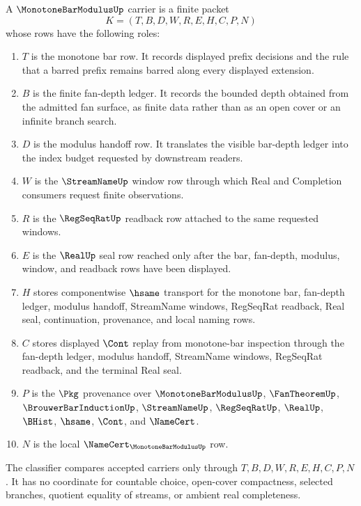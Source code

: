 \begin{definition}
\label{def:monotone-bar-modulus-carrier}
A $\MonotoneBarModulusUp$ carrier is a finite packet
$$
K=(T,B,D,W,R,E,H,C,P,N)
$$
whose rows have the following roles:
\begin{enumerate}
\item $T$ is the monotone bar row. It records displayed prefix decisions and the rule that a barred prefix remains barred along every displayed extension.
\item $B$ is the finite fan-depth ledger. It records the bounded depth obtained from the admitted fan surface, as finite data rather than as an open cover or an infinite branch search.
\item $D$ is the modulus handoff row. It translates the visible bar-depth ledger into the index budget requested by downstream readers.
\item $W$ is the $\StreamNameUp$ window row through which Real and Completion consumers request finite observations.
\item $R$ is the $\RegSeqRatUp$ readback row attached to the same requested windows.
\item $E$ is the $\RealUp$ seal row reached only after the bar, fan-depth, modulus, window, and readback rows have been displayed.
\item $H$ stores componentwise $\hsame$ transport for the monotone bar, fan-depth ledger, modulus handoff, StreamName windows, RegSeqRat readback, Real seal, continuation, provenance, and local naming rows.
\item $C$ stores displayed $\Cont$ replay from monotone-bar inspection through the fan-depth ledger, modulus handoff, StreamName windows, RegSeqRat readback, and the terminal Real seal.
\item $P$ is the $\Pkg$ provenance over $\MonotoneBarModulusUp$, $\FanTheoremUp$, $\BrouwerBarInductionUp$, $\StreamNameUp$, $\RegSeqRatUp$, $\RealUp$, $\BHist$, $\hsame$, $\Cont$, and $\NameCert$.
\item $N$ is the local $\NameCert_{\MonotoneBarModulusUp}$ row.
\end{enumerate}
The classifier compares accepted carriers only through $T,B,D,W,R,E,H,C,P,N$. It has no coordinate for countable choice, open-cover compactness, selected branches, quotient equality of streams, or ambient real completeness.
\end{definition}

